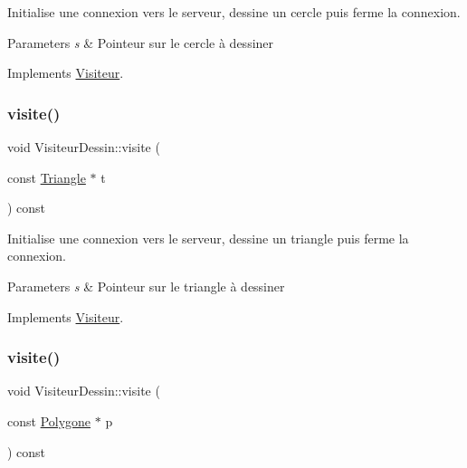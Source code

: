 Initialise une connexion vers le serveur, dessine un cercle puis ferme la connexion. 


\begin{DoxyParams}{Parameters}
{\em s} & Pointeur sur le cercle à dessiner \\
\hline
\end{DoxyParams}


Implements \hyperlink{class_visiteur_a0af8611572f009ff37b9429facc7eaec}{Visiteur}.

\mbox{\label{class_visiteur_dessin_a8278a3991c52c9d00e5ad5a051faacfe}} 
\subsubsection{\texorpdfstring{visite()}{visite()}\hspace{0.1cm}{\footnotesize\ttfamily [3/5]}}
{\footnotesize\ttfamily void Visiteur\+Dessin\+::visite (\begin{DoxyParamCaption}\item[{const \hyperlink{class_triangle}{Triangle} $\ast$}]{t }\end{DoxyParamCaption}) const\hspace{0.3cm}{\ttfamily [virtual]}}



Initialise une connexion vers le serveur, dessine un triangle puis ferme la connexion. 


\begin{DoxyParams}{Parameters}
{\em s} & Pointeur sur le triangle à dessiner \\
\hline
\end{DoxyParams}


Implements \hyperlink{class_visiteur_a65332165fada93947fbad9a4d9eebf2c}{Visiteur}.

\mbox{\label{class_visiteur_dessin_a59ef1f9a400906300fa4e6d3c1ec0ea1}} 
\subsubsection{\texorpdfstring{visite()}{visite()}\hspace{0.1cm}{\footnotesize\ttfamily [4/5]}}
{\footnotesize\ttfamily void Visiteur\+Dessin\+::visite (\begin{DoxyParamCaption}\item[{const \hyperlink{class_polygone}{Polygone} $\ast$}]{p }\end{DoxyParamCaption}) const\hspace{0.3cm}{\ttfamily [virtual]}}



